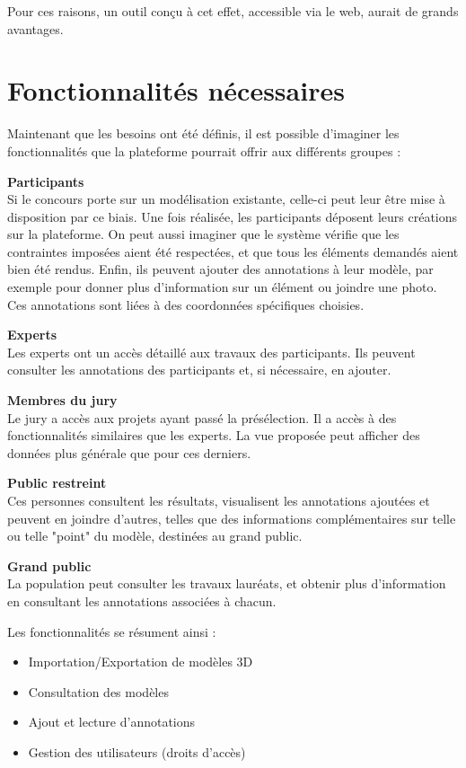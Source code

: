Pour ces raisons, un outil conçu à cet effet, accessible via le web, aurait de grands avantages.

\section{Fonctionnalités nécessaires}

Maintenant que les besoins ont été définis, il est possible d'imaginer les fonctionnalités que la plateforme pourrait offrir aux différents groupes :

\textbf{Participants} \\
Si le concours porte sur un modélisation existante, celle-ci peut leur être mise à disposition par ce biais.
Une fois réalisée, les participants déposent leurs créations sur la plateforme. On peut aussi imaginer que le système vérifie que les contraintes imposées aient été respectées, et que tous les éléments demandés aient bien été rendus.
Enfin, ils peuvent ajouter des annotations à leur modèle, par exemple pour donner plus d'information sur un élément ou joindre une photo. Ces annotations sont liées à des coordonnées spécifiques choisies.

\textbf{Experts} \\
Les experts ont un accès détaillé aux travaux des participants. Ils peuvent consulter les annotations des participants et, si nécessaire, en ajouter.

\textbf{Membres du jury} \\
Le jury a accès aux projets ayant passé la présélection. Il a accès à des fonctionnalités similaires que les experts. La vue proposée peut afficher des données plus générale que pour ces derniers.

\textbf{Public restreint} \\
Ces personnes consultent les résultats, visualisent les annotations ajoutées et peuvent en joindre d'autres, telles que des informations complémentaires sur telle ou telle "point" du modèle, destinées au grand public.

\textbf{Grand public} \\
La population peut consulter les travaux lauréats, et obtenir plus d'information en consultant les annotations associées à chacun.

Les fonctionnalités se résument ainsi :

\begin{itemize}
    \item Importation/Exportation de modèles 3D
    \item Consultation des modèles
    \item Ajout et lecture d'annotations
    \item Gestion des utilisateurs (droits d'accès)
\end{itemize}

